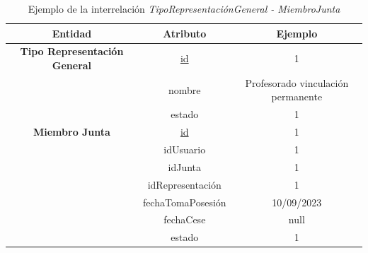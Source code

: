 \begin{itemize}
    \begin{table}[H]
    \centering
        \begin{tabular}{ | c | c | c |  }
             \hline
                 \textbf{Entidad} & \textbf{Atributo} & \textbf{Ejemplo}\\       
             \hline
                 \textbf{Tipo Representación General}  & \underline{id} & 1\\
                  & nombre & Profesorado vinculación permanente\\
                  & estado & 1\\
             \hline
                 \textbf{Miembro Junta}  & \underline{id} & 1\\
                  & idUsuario & 1\\
                  & idJunta & 1\\
                  & idRepresentación & 1\\
                  & fechaTomaPosesión & 10/09/2023\\
                  & fechaCese & null\\
                  & estado & 1\\
        \end{tabular}
        \caption{Ejemplo de la interrelación \textit{TipoRepresentaciónGeneral - MiembroJunta}}
        \label{table:I-TipRG-MiJu}
    \end{table}
\end{itemize}

